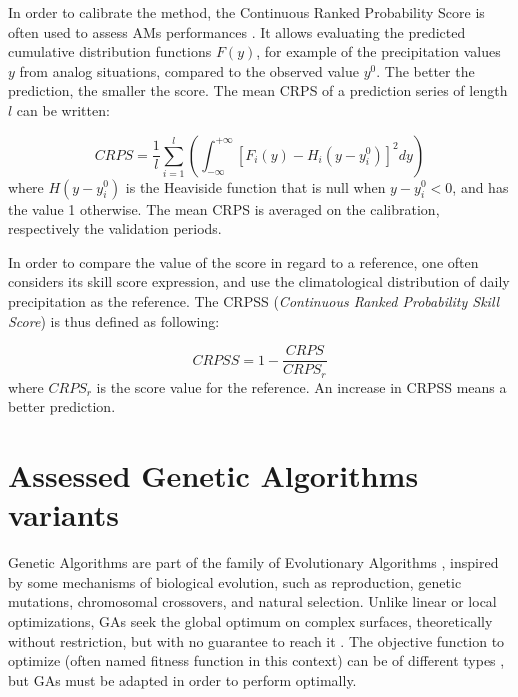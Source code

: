 \documentclass{ametsoc}
\begin{document}
In order to calibrate the method, the Continuous Ranked Probability Score \citep[CRPS,][]{Brown1974, Matheson1976, Hersbach2000} is often used to assess AMs performances \citep[see, e.g.,][]{Bontron2004, Bontron2005, BenDaoud2008, Horton2012, Marty2012, Radanovics2013, Chardon2014, Junk2015, BenDaoud2016, Caillouet2016}. It allows evaluating the predicted cumulative distribution functions $F(y)$, for example of the precipitation values $y$ from analog situations, compared to the observed value $y^{0}$. The better the prediction, the smaller the score. The mean CRPS of a prediction series of length $l$ can be written:

\begin{equation}
\label{eq:CRPS}
CRPS = \frac{1}{l} \sum_{i=1}^{l} \left(  \int_{-\infty}^{+\infty} \left[ F_{i}(y)-H_{i}(y-y_{i}^{0})\right]^{2} dy \right) 
\end{equation}
where $H(y-y_{i}^{0})$ is the Heaviside function that is null when $y-y_{i}^{0}<0$, and has the value 1 otherwise. The mean CRPS is averaged on the calibration, respectively the validation periods.

In order to compare the value of the score in regard to a reference, one often considers its skill score expression, and use the climatological distribution of daily precipitation as the reference. The CRPSS (\textit{Continuous Ranked Probability Skill Score}) is thus defined as following:

\begin{equation}
\label{eq:CRPSS}
CRPSS = 1-\frac{CRPS}{CRPS_{r}}
\end{equation}
where $CRPS_{r}$ is the score value for the reference. An increase in CRPSS means a better prediction.


\section{Assessed Genetic Algorithms variants}
\label{sec:gas}

Genetic Algorithms \citep[GAs,][]{Holland1992b, Goldberg1989} are part of the family of Evolutionary Algorithms \citep{Back1993b, Schwefel1993}, inspired by some mechanisms of biological evolution, such as reproduction, genetic mutations, chromosomal crossovers, and natural selection. Unlike linear or local optimizations, GAs seek the global optimum on complex surfaces, theoretically without restriction, but with no guarantee to reach it \citep{Haupt2004}. The objective function to optimize (often named fitness function in this context) can be of different types \citep{Joines1996a}, but GAs must be adapted in order to perform optimally.
\end{document}
